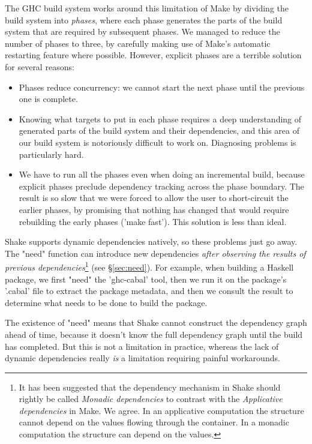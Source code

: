 The GHC build system works around this limitation of Make by
dividing the build system into \emph{phases}, where each phase
generates the parts of the build system that are required by
subsequent phases. We managed to reduce the number of phases to
three, by carefully making use of Make's automatic restarting
feature where possible. However, explicit phases are a terrible
solution for several reasons:

\begin{itemize}
\item Phases reduce concurrency: we cannot start the next phase until
  the previous one is complete.
\item Knowing what targets to put in each phase requires a deep
  understanding of generated parts of the build system and their dependencies,
  and this area of our build system is notoriously difficult to work on.
  Diagnosing problems is particularly hard.
\item We have to run all the phases even when doing an incremental build,
 because explicit phases preclude dependency tracking across the phase boundary.
 The result is so slow that we were forced to allow the user to short-circuit
 the earlier phases, by promising that nothing has changed that would require
 rebuilding the early phases (\lst'make fast').  This solution is less than
 ideal.
\end{itemize}

Shake supports dynamic dependencies natively, so these problems just
go away.  The \lst"need" function can introduce new dependencies
\emph{after observing the results of previous dependencies}\footnote{It has been
suggested that the dependency mechanism in Shake should rightly be called
\emph{Monadic dependencies} to contrast with the \emph{Applicative dependencies}
in Make. We agree. In an applicative computation the structure cannot depend on
the values flowing through the container. In a monadic computation the structure can
depend on the values.}
(see \S\ref{sec:need}). For example, when building a Haskell package, we first
\lst"need" the \lst'ghc-cabal' tool, then we run it on the package's \lst'.cabal' file to
extract the package metadata, and then we consult the result to determine what
needs to be done to build the package.

The existence of \lst"need" means that Shake cannot construct the
dependency graph ahead of time, because it doesn't know the full
dependency graph until the build has completed.  But this is not a
limitation in practice, whereas the lack of dynamic dependencies really
\emph{is} a limitation requiring painful workarounds.


